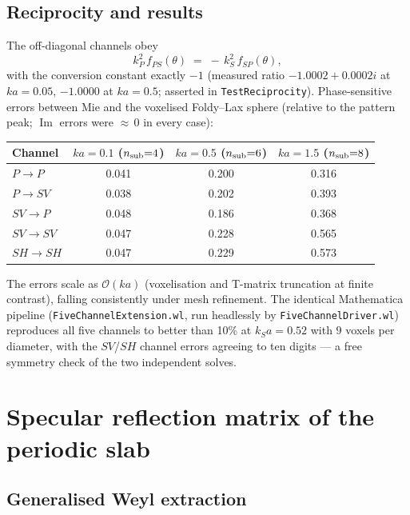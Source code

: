 \documentclass[11pt,a4paper]{article}
\newcommand{\order}[1]{\mathcal{O}\!\left(#1\right)}
\newcommand{\im}{\operatorname{Im}}
\newcommand{\code}[1]{\texttt{#1}}
\begin{document}
\subsection{Reciprocity and results}

The off-diagonal channels obey
\begin{equation}
  k_P^2\, f_{PS}(\theta) \;=\; -\,k_S^2\, f_{SP}(\theta),
  \label{eq:sphere-recip}
\end{equation}
with the conversion constant exactly $-1$ (measured ratio
$-1.0002 + 0.0002i$ at $ka = 0.05$, $-1.0000$ at $ka = 0.5$; asserted in
\code{TestReciprocity}).  Phase-sensitive errors between Mie and the
voxelised Foldy--Lax sphere (relative to the pattern peak; $\im$ errors
were ${\approx}\,0$ in every case):

\begin{center}
\begin{tabular}{lccc}
\toprule
Channel & $ka=0.1$ ($n_{\rm sub}{=}4$) & $ka=0.5$ ($n_{\rm sub}{=}6$)
        & $ka=1.5$ ($n_{\rm sub}{=}8$) \\
\midrule
$P{\to}P$   & 0.041 & 0.200 & 0.316 \\
$P{\to}SV$  & 0.038 & 0.202 & 0.393 \\
$SV{\to}P$  & 0.048 & 0.186 & 0.368 \\
$SV{\to}SV$ & 0.047 & 0.228 & 0.565 \\
$SH{\to}SH$ & 0.047 & 0.229 & 0.573 \\
\bottomrule
\end{tabular}
\end{center}

The errors scale as $\order{ka}$ (voxelisation and T-matrix truncation
at finite contrast), falling consistently under mesh refinement.  The
identical Mathematica pipeline (\code{FiveChannelExtension.wl}, run
headlessly by \code{FiveChannelDriver.wl}) reproduces all five channels
to better than 10\% at $k_S a = 0.52$ with $9$ voxels per diameter, with
the $SV$/$SH$ channel errors agreeing to ten digits --- a free
symmetry check of the two independent solves.

\section{Specular reflection matrix of the periodic slab}
\label{sec:slab}

\subsection{Generalised Weyl extraction}
\end{document}
